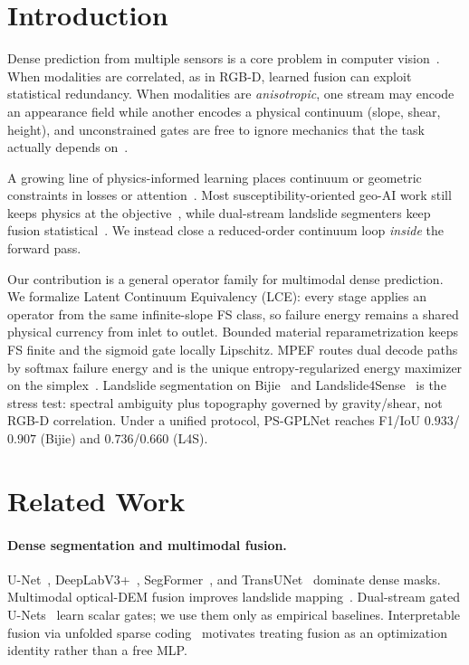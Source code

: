 \documentclass[10pt,twocolumn,letterpaper]{article}
\begin{document}
\section{Introduction}
Dense prediction from multiple sensors is a core problem in computer vision~\cite{ronneberger2015unet,chen2018deeplab,xie2021segformer}. When modalities are correlated, as in RGB-D, learned fusion can exploit statistical redundancy. When modalities are \emph{anisotropic}, one stream may encode an appearance field while another encodes a physical continuum (slope, shear, height), and unconstrained gates are free to ignore mechanics that the task actually depends on~\cite{yin2021virtualnormal,wang2025gravityformer}.

A growing line of physics-informed learning places continuum or geometric constraints in losses or attention~\cite{raissi2019pinn,karniadakis2021physics,yin2021virtualnormal,clough2022topological,wang2025gravityformer,panda2025sparsefusion}. Most susceptibility-oriented geo-AI work still keeps physics at the objective~\cite{dahal2024pinn,liu2023physics}, while dual-stream landslide segmenters keep fusion statistical~\cite{islam2024digate,mercier2022bifusion}. We instead close a reduced-order continuum loop \emph{inside} the forward pass.

Our contribution is a general operator family for multimodal dense prediction. We formalize Latent Continuum Equivalency (LCE): every stage applies an operator from the same infinite-slope FS class, so failure energy remains a shared physical currency from inlet to outlet. Bounded material reparametrization keeps FS finite and the sigmoid gate locally Lipschitz. MPEF routes dual decode paths by softmax failure energy and is the unique entropy-regularized energy maximizer on the simplex~\cite{boyd2004convex}. Landslide segmentation on Bijie~\cite{ji2020bijie} and Landslide4Sense~\cite{ghorbanzadeh2022landslide4sense} is the stress test: spectral ambiguity plus topography governed by gravity/shear, not RGB-D correlation. Under a unified protocol, PS-GPLNet reaches F1/IoU $0.933$/$0.907$ (Bijie) and $0.736$/$0.660$ (L4S).

\section{Related Work}
\paragraph{Dense segmentation and multimodal fusion.}
U-Net~\cite{ronneberger2015unet}, DeepLabV3+~\cite{chen2018deeplab}, SegFormer~\cite{xie2021segformer}, and TransUNet~\cite{chen2021transunet} dominate dense masks. Multimodal optical-DEM fusion improves landslide mapping~\cite{ji2020bijie,ghorbanzadeh2022landslide4sense,mercier2022bifusion,ghorbanzadeh2019landslide}. Dual-stream gated U-Nets~\cite{islam2024digate} learn scalar gates; we use them only as empirical baselines. Interpretable fusion via unfolded sparse coding~\cite{panda2025sparsefusion} motivates treating fusion as an optimization identity rather than a free MLP.
\end{document}
